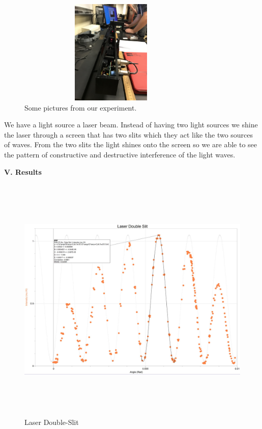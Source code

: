 \documentclass[fleqn]{article}
\begin{document}
\begin{figure}[h!]
    \includegraphics[height=5cm, width=9cm]{2 (6).jpg}
    \caption{
      Some pictures from our experiment.
    }
  \end{figure}

  We have a light source a laser beam. Instead of having two light sources we shine the laser through a
  screen that has two slits which they act like the two sources of waves. From the two slits the light
  shines onto the screen so we are able to see the pattern of constructive and destructive interference 
  of the light waves.
  
  \vspace{20px}


  \textbf{V. Results}

  \vspace{10px}

    
  \begin{figure}[h!]
    \includegraphics[height=12cm, width=18cm]{Fig1.JPG}
    \caption{
      Laser Double-Slit
    }
  \end{figure}
\end{document}
